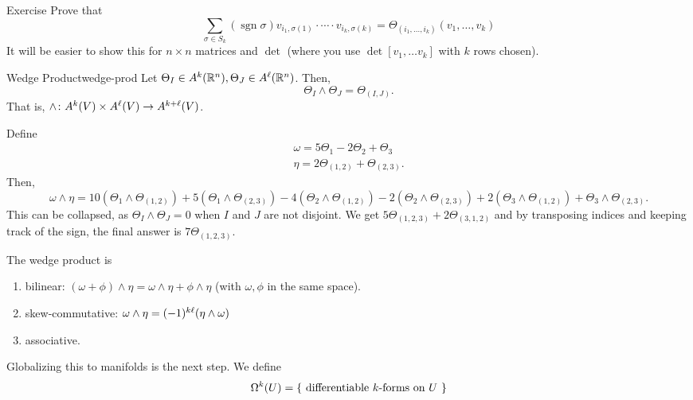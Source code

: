 \documentclass{article}
\begin{document}
\begin{example}{Exercise}{}
  Prove that
  \[ \sum_{\sigma \in S_{k}} (\operatorname{sgn} \sigma) v_{i_{1}, \sigma(1)} \cdot \cdots \cdot v_{i_{k}, \sigma(k)} = \Theta_{(i_{1}, \ldots, i_{k})}(v_{1}, \ldots, v_{k}) \]
  It will be easier to show this for $n \times n$ matrices and $\det$ (where you use $\det [v_{1}, \ldots v_{k}]$ with $k$ rows chosen).
\end{example}

\begin{definition}{Wedge Product}{wedge-prod}
  Let $\Theta_{I} \in A^{k}(\RR[n]), \Theta_{J} \in A^{\ell}(\RR[n])$. Then,
  \[ \Theta_{I} \wedge \Theta_{J} = \Theta_{(I, J)}. \]
  That is, $\wedge \from A^{k}(V) \times A^{\ell}(V) \to A^{k + \ell}(V)$.
\end{definition}
\begin{example}{}{}
  Define
  \begin{align*}
    \omega = 5\Theta_{1} - 2\Theta_{2} + \Theta_{3}\\
    \eta = 2\Theta_{(1, 2)} + \Theta_{(2, 3)}.
  \end{align*}
  Then,
  \[ \omega \wedge \eta =
    10(\Theta_{1} \wedge \Theta_{(1, 2)}) + 5(\Theta_{1} \wedge \Theta_{(2, 3)}) - 4(\Theta_{2} \wedge \Theta_{(1, 2)})
    - 2(\Theta_{2} \wedge \Theta_{(2, 3)}) + 2(\Theta_{3} \wedge \Theta_{(1, 2)}) + \Theta_{3} \wedge \Theta_{(2, 3)}.
  \]
  This can be collapsed, as $\Theta_{I} \wedge \Theta_{J} = 0$ when $I$ and $J$ are not disjoint.
  We get $5\Theta_{(1, 2, 3)} + 2\Theta_{(3, 1, 2)}$ and by transposing indices and keeping track of the sign, the final answer is $7\Theta_{(1, 2, 3)}$.
\end{example}

\begin{proposition}{}{}
  The wedge product is
  \begin{enumerate}[start=1,label={\arabic*\rparen}]
    \item bilinear: $(\omega + \phi) \wedge \eta = \omega \wedge \eta + \phi \wedge \eta$ (with $\omega, \phi$ in the same space).
    \item skew-commutative: $\omega \wedge \eta = \pars{-1}^{k\ell}(\eta \wedge \omega)$
    \item associative.
  \end{enumerate}
\end{proposition}

Globalizing this to manifolds is the next step.
We define
\[ \Omega^{k}(U) = \set*{ \mbox{\text{ differentiable $k$-forms on $U$ }} } \]
\end{document}
